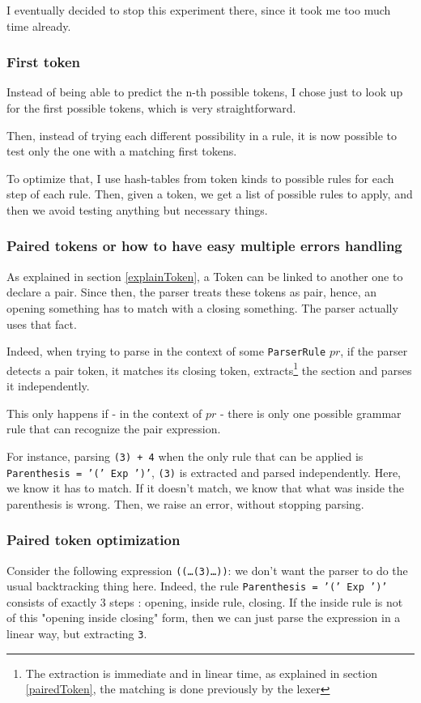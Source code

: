 \documentclass{article}
\newcommand\cc[1]{\lstinline{#1}}
\begin{document}
			I eventually decided to stop this experiment there, since it took me too much time already.  

			\subsubsection{First token}
			Instead of being able to predict the n-th possible tokens, I chose just to look up for the first possible tokens, which is very straightforward.

			Then, instead of trying each different possibility in a rule, it is now possible to test only the one with a matching first tokens.

			To optimize that, I use hash-tables from token kinds to possible rules for each step of each rule. Then, given a token, we get a list of possible rules to apply, and then we avoid testing anything but necessary things.

			\subsubsection{Paired tokens or how to have easy multiple errors handling}
			As explained in section \ref{explainToken}, a Token can be linked to another one to declare a pair. Since then, the parser treats these tokens as pair, hence, an opening something has to match with a closing something. The parser actually uses that fact.

			Indeed, when trying to parse in the context of some \cc{ParserRule} $pr$, if the parser detects a pair token, it matches its closing token, extracts\footnote{The extraction is immediate and in linear time, as explained in section \ref{pairedToken}, the matching is done previously by the lexer} the section and parses it independently.

			This only happens if - in the context of $pr$ - there is only one possible grammar rule that can recognize the pair expression.

			For instance, parsing \texttt{(3) + 4} when the only rule that can be applied is \texttt{Parenthesis = '(' Exp ')'}, \texttt{(3)} is extracted and parsed independently. Here, we know it has to match. If it doesn't match, we know that what was inside the parenthesis is wrong. Then, we raise an error, without stopping parsing. 

			\subsubsection{Paired token optimization}
			Consider the following expression \texttt{((\dots(3)\dots))}: we don't want the parser to do the usual backtracking thing here. Indeed, the rule \texttt{Parenthesis = '(' Exp ')'} consists of exactly 3 steps : opening, inside rule, closing. If the inside rule is not of this "opening inside closing" form, then we can just parse the expression in a linear way, but extracting \texttt{3}.
\end{document}
